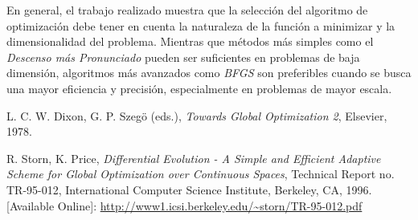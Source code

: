 \documentclass{article}
\begin{document}
	En general, el trabajo realizado muestra que la selección del algoritmo de optimización debe tener en cuenta la naturaleza de la función a minimizar y la dimensionalidad del problema. Mientras que métodos más simples como el \textit{Descenso más Pronunciado} pueden ser suficientes en problemas de baja dimensión, algoritmos más avanzados como \textit{BFGS} son preferibles cuando se busca una mayor eficiencia y precisión, especialmente en problemas de mayor escala.
	
	\newpage
	
	\begin{thebibliography}{9}
		
		 L. C. W. Dixon, G. P. Szegö (eds.), \textit{Towards Global Optimization 2}, Elsevier, 1978.
		
		 R. Storn, K. Price, \textit{Differential Evolution - A Simple and Efficient Adaptive Scheme for Global Optimization over Continuous Spaces}, Technical Report no. TR-95-012, International Computer Science Institute, Berkeley, CA, 1996. [Available Online]: \url{http://www1.icsi.berkeley.edu/~storn/TR-95-012.pdf}
		
		
	\end{thebibliography}
	
\end{document}
